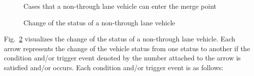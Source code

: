 \documentclass[10pt, conference, compsocconf]{IEEEtran}
\begin{document}
\begin{figure}[h]
\begin{center}
\end{center}
\caption{Cases that a non-through lane vehicle can enter the merge point}
\label{space}
\end{figure}

\begin{figure}[h]
\begin{center}
\end{center}
\caption{Change of the status of a non-through lane vehicle}
\label{nonThroughLaneStatus}
\end{figure}

Fig.~\ref{nonThroughLaneStatus} visualizes the change of the status of
a non-through lane vehicle.  Each arrow represents the change of the
vehicle status from one status to another if the condition and/or trigger
event denoted by the number attached to the arrow is satisfied and/or
occurs.  Each condition and/or trigger event is as follows:
\end{document}
